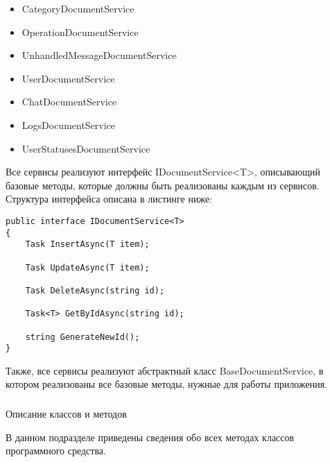 \begin{itemize}
	\item CategoryDocumentService
	\item OperationDocumentService
	\item UnhandledMessageDocumentService
	\item UserDocumentService
	\item ChatDocumentService
	\item LogsDocumentService
	\item UserStatusesDocumentService
\end{itemize}

Все сервисы реализуют интерфейс IDocumentService<T>, описывающий базовые методы, которые должны быть реализованы каждым из сервисов. Структура интерфейса описана в листинге ниже:

\lstset{style=sharpc}
\begin{lstlisting}
public interface IDocumentService<T>
{
	Task InsertAsync(T item);

	Task UpdateAsync(T item);

	Task DeleteAsync(string id);

	Task<T> GetByIdAsync(string id);

	string GenerateNewId();
}
\end{lstlisting}

Также, все сервисы реализуют абстрактный класс \linebreak BaseDocumentService, в котором реализованы все базовые методы, нужные для работы приложения.

\subsubsection{} Описание классов и методов
\label{sec:design:server:methods}

В данном подразделе приведены сведения обо всех методах классов программного средства.

